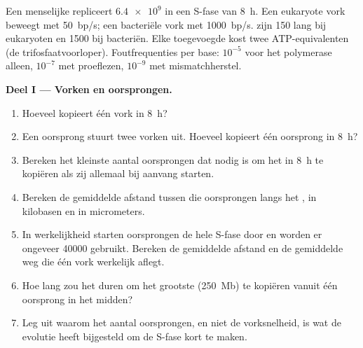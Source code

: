 \begin{problem}
\label{pb:b1:replication-mitosis:1}
Een menselijke  repliceert $\num{6.4e9}$  in een S-fase van
\qty{8}{h}. Een eukaryote vork beweegt met \qty{50}{bp/s}; een bacteriële vork met
\qty{1000}{bp/s}.  zijn \qty{150}{}  lang bij
eukaryoten en \qty{1500}{} bij bacteriën. Elke toegevoegde  kost twee
ATP-equivalenten (de trifosfaatvoorloper). Foutfrequenties per base: $10^{-5}$ voor
het polymerase alleen, $10^{-7}$ met proeflezen, $10^{-9}$ met mismatchherstel.

\medskip
\noindent\textbf{Deel I --- Vorken en oorsprongen.}
\begin{enumerate}
  \item Hoeveel  kopieert één vork in \qty{8}{h}?
  \item Een oorsprong stuurt twee vorken uit. Hoeveel  kopieert
        één oorsprong in \qty{8}{h}?
  \item Bereken het kleinste aantal oorsprongen dat nodig is om het 
        in \qty{8}{h} te kopiëren als zij allemaal bij aanvang starten.
  \item Bereken de gemiddelde afstand tussen die oorsprongen langs het ,
        in kilobasen en in micrometers.
  \item In werkelijkheid starten oorsprongen de hele S-fase door en worden
        er ongeveer \num{40000} gebruikt. Bereken de gemiddelde afstand en
        de gemiddelde weg die één vork werkelijk aflegt.
  \item Hoe lang zou het duren om het grootste  (\qty{250}{Mb})
        te kopiëren vanuit één oorsprong in het midden?
  \item Leg uit waarom het aantal oorsprongen, en niet de vorksnelheid, is
        wat de evolutie heeft bijgesteld om de S-fase kort te maken.
\end{enumerate}


\end{problem}
